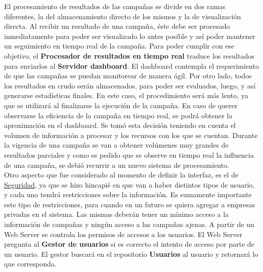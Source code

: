 \documentclass[a4paper, 11pt]{article}
\begin{document}
El procesamiento de resultados de las campa\~nas se divide en dos ramas diferentes, la del almacenamiento directo de los mismos y la de visualización directa. 
Al recibir un resultado de una campa\~na, éste debe ser procesado inmediatamente para poder ser visualizado lo antes posible y así poder mantener un seguimiento en tiempo real de la campa\~na. Para poder cumplir con ese objetivo, el \textbf{Procesador de resultados en tiempo real} traduce los resultados para enviarlos al \textbf{Servidor dashboard}. El dashboard contempla el requerimiento de que las campa\~nas se puedan monitorear de manera ágil. %
Por otro lado, todos los resultados en crudo serán almacenados, para poder ser evaluados, luego, y así generarse estadísticas finales. 
En este caso, el procedimiento será más lento, ya que se utilizará al finalizarse la ejecución de la campa\~na. En caso de querer observarse la eficiencia de la campa\~na en tiempo real, se podrá obtener la aproximación en el dashboard. 
Se tomó esta decisión teniendo en cuenta el volumen de información a procesar y los recursos con los que se cuentan. Durante la vigencia de una campa\~na se van a obtener volúmenes muy grandes de resultados parciales y como es pedido que se observe en tiempo real la influencia de una campa\~na, se debió recurrir a un nuevo sistema de procesamiento.\\

Otro aspecto que fue considerado al momento de definir la interfaz, es el de \underline{Seguridad}, ya que se hizo hincapié en que van a haber distintos tipos de usuario, y cada uno tendrá restricciones sobre la información. Es sumamente importante este tipo de restricciones, para cuando en un futuro se quiera agregar a empresas privadas en el sistema. Las mismas deberán tener un mínimo acceso a la información de campa\~nas y ningún acceso a las campa\~nas ajenas. A partir de un Web Server se controla los permisos de accesos a los usuarios. El Web Server pregunta al \textbf{Gestor de usuarios} si es correcto el intento de acceso por parte de un usuario. El gestor buscará en el repositorio \textbf{Usuarios} al usuario y retornará lo que corresponda. \\
\end{document}
